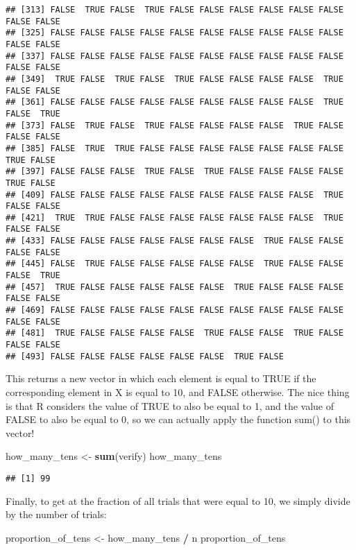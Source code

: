 \documentclass[
]{book}
\newenvironment{Shaded}{\begin{snugshade}}{\end{snugshade}}
\newcommand{\KeywordTok}[1]{\textcolor[rgb]{0.13,0.29,0.53}{\textbf{#1}}}
\newcommand{\NormalTok}[1]{#1}
\newcommand{\OperatorTok}[1]{\textcolor[rgb]{0.81,0.36,0.00}{\textbf{#1}}}
\newcommand{\StringTok}[1]{\textcolor[rgb]{0.31,0.60,0.02}{#1}}
\begin{document}
\begin{verbatim}
## [313] FALSE  TRUE FALSE  TRUE FALSE FALSE FALSE FALSE FALSE FALSE FALSE FALSE
## [325] FALSE FALSE FALSE FALSE FALSE FALSE FALSE FALSE FALSE FALSE FALSE FALSE
## [337] FALSE FALSE FALSE FALSE FALSE FALSE FALSE FALSE FALSE FALSE FALSE FALSE
## [349]  TRUE FALSE  TRUE FALSE  TRUE FALSE FALSE FALSE FALSE  TRUE FALSE FALSE
## [361] FALSE FALSE FALSE FALSE FALSE FALSE FALSE FALSE FALSE  TRUE FALSE  TRUE
## [373] FALSE  TRUE FALSE  TRUE FALSE FALSE FALSE FALSE  TRUE FALSE FALSE FALSE
## [385] FALSE  TRUE  TRUE FALSE FALSE FALSE FALSE FALSE FALSE FALSE  TRUE FALSE
## [397] FALSE FALSE FALSE  TRUE FALSE  TRUE FALSE FALSE FALSE FALSE  TRUE FALSE
## [409] FALSE FALSE FALSE FALSE FALSE FALSE FALSE FALSE FALSE  TRUE FALSE FALSE
## [421]  TRUE  TRUE FALSE FALSE FALSE FALSE FALSE FALSE FALSE  TRUE FALSE FALSE
## [433] FALSE FALSE FALSE FALSE FALSE FALSE FALSE  TRUE FALSE FALSE FALSE FALSE
## [445] FALSE  TRUE FALSE FALSE FALSE FALSE FALSE  TRUE FALSE FALSE FALSE  TRUE
## [457]  TRUE FALSE FALSE FALSE FALSE FALSE  TRUE FALSE FALSE FALSE FALSE FALSE
## [469] FALSE FALSE FALSE FALSE FALSE FALSE FALSE FALSE FALSE FALSE FALSE FALSE
## [481]  TRUE FALSE FALSE FALSE FALSE  TRUE FALSE FALSE  TRUE FALSE FALSE FALSE
## [493] FALSE FALSE FALSE FALSE FALSE FALSE  TRUE FALSE
\end{verbatim}

This returns a new vector in which each element is equal to TRUE if the corresponding element in X is equal to 10, and FALSE otherwise. The nice thing is that R considers the value of TRUE to also be equal to 1, and the value of FALSE to also be equal to 0, so we can actually apply the function sum() to this vector!

\begin{Shaded}
\begin{Highlighting}[]
\NormalTok{how\_many\_tens \textless{}{-}}\StringTok{ }\KeywordTok{sum}\NormalTok{(verify)}
\NormalTok{how\_many\_tens}
\end{Highlighting}
\end{Shaded}

\begin{verbatim}
## [1] 99
\end{verbatim}

Finally, to get at the fraction of all trials that were equal to 10, we simply divide by the number of trials:

\begin{Shaded}
\begin{Highlighting}[]
\NormalTok{proportion\_of\_tens \textless{}{-}}\StringTok{ }\NormalTok{how\_many\_tens }\OperatorTok{/}\StringTok{ }\NormalTok{n}
\NormalTok{proportion\_of\_tens}
\end{Highlighting}
\end{Shaded}
\end{document}
